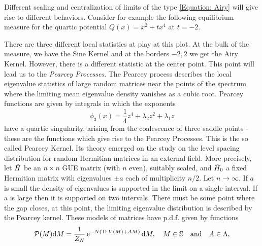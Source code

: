 Different scaling and centralization of limits of the type \eqref{Equation: Airy} will give rise to different behaviors.  Consider for example the following equilibrium measure for the quartic potential $Q(x) = x^2 + t x^4$ at $t = -2$.
\begin{figure}[h!]
	\centering
\end{figure}
There are three different local statistics at play at this plot. At the bulk of the measure, we have the Sine Kernel and at the borders $-2, 2$ we get the Airy Kernel.  However, there is a different statistic at the center point. This point will lead us to the \textit{Pearcey Processes}.  The Pearcey process describes the local eigenvalue statistics of large random matrices near the points of the spectrum where the limiting mean eigenvalue density vanishes as a cubic root. Pearcey functions are given by integrals in which the exponents 
 \begin{equation}
 	\phi_3(x) = \frac{1}{4} z^4 + \lambda_2 z^2 + \lambda_1 z
 \end{equation}
 have a quartic singularity, arising from the coalescence of three saddle points - these are the functions which give rise to the Pearcey Processes. This is the so called Pearcey Kernel. Its theory emerged on the study on the level spacing distribution for random Hermitian matrices in an external field. More precisely, let $\hat H$ be an $n \times n$ GUE matrix (with $n$ even), suitably scaled, and $\hat H_0$ a fixed Hermitian matrix with eigenvalues $\pm a$ each of multiplicity $n/2$. Let $n \rightarrow \infty$. If $a$ is small the density of eigenvalues is supported in the limit on a single interval. If a is large then it is supported on two intervals. There must be some point where the gap closes, at this point, the limiting eigenvalue distribution is described by the Pearcey kernel. These models of matrices have p.d.f. given by functions 
\begin{equation}
	\mathcal{P}(M) \mathrm{d} M = \frac{1}{Z_{N}} \operatorname{e}^{- N \left( \operatorname{Tr}{V(M)} + AM \right)} \mathrm{d} M,\quad  M \in \mathbb{S}  \quad \text{and} \quad A \in \Lambda,
	\label{Equation: external source measure}
\end{equation}

